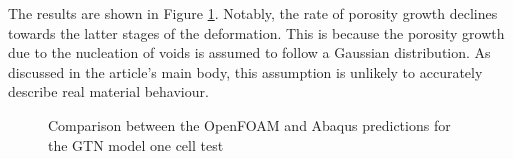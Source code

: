 \documentclass[sn-mathphys,Numbered]{sn-jnl}%
\begin{document}
\begin{appendices}
The results are shown in Figure \ref{fig:one_elem_GTN_results}. 
Notably, the rate of porosity growth declines towards the latter stages of the deformation.
This is because the porosity growth due to the nucleation of voids is assumed to follow a Gaussian distribution.
As discussed in the article's main body, this assumption is unlikely to accurately describe real material behaviour. 
\begin{figure}[htbp]
	\centering
		\caption{Comparison between the OpenFOAM and Abaqus predictions for the GTN model one cell test}
	\label{fig:one_elem_GTN_results}
\end{figure}



\end{appendices}
\end{document}
